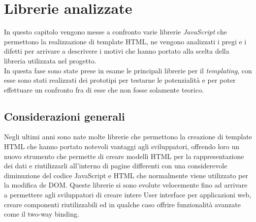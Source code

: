 
\chapter{Librerie analizzate}
\label{cap:librerie-analizzate}
In questo capitolo vengono messe a confronto varie librerie \textit{JavaScript} che permettono la realizzazione di template HTML, ne vengono analizzati i pregi e i difetti per arrivare a descrivere i motivi che hanno portato alla scelta della libreria utilizzata nel progetto.\\
In questa fase sono state prese in esame le principali librerie per il \textit{templating}, con esse sono stati realizzati dei prototipi per testarne le potenzialità e per poter effettuare un confronto fra di esse che non fosse solamente teorico.

\section{Considerazioni generali}
Negli ultimi anni sono nate molte librerie che permettono la creazione di template HTML che hanno portato notevoli vantaggi agli sviluppatori, offrendo loro un nuovo strumento che permette di creare modelli HTML per la rappresentazione dei dati e riutilizzarli all'interno di pagine differenti con una considerevole diminuzione del codice JavaScript e HTML che normalmente viene utilizzato per la modifica de DOM.
Queste librerie si sono evolute velocemente fino ad arrivare a permettere agli sviluppatori di creare intere User interface per applicazioni web, creare componenti riutilizzabili ed in qualche caso offrire funzionalità avanzate come il two-way binding.

